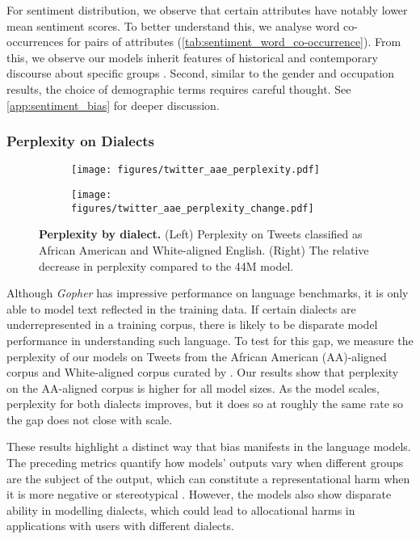 \documentclass[11pt, a4paper, logo, internal, copyright, nonumbering]{deepmind}
\newcommand{\gopher}{\textit{Gopher}\xspace}
\begin{document}
For sentiment distribution, we observe that certain attributes have notably lower mean sentiment scores.
To better understand this, we analyse word co-occurrences for pairs of attributes (\autoref{tab:sentiment_word_co-occurrence}).
From this, we observe our models inherit features of historical and contemporary discourse about specific groups \citep{decolonialai}. Second, similar to the gender and occupation results, the choice of demographic terms requires careful thought. See \autoref{app:sentiment_bias} for deeper discussion.


\subsubsection{Perplexity on Dialects}

\begin{figure}[t]
\centering
\begin{subfigure}[b]{.45\textwidth}
  \centering
  \texttt{[image: figures/twitter\_aae\_perplexity.pdf]}
  \label{fig:twitter_aae_ppx}
\end{subfigure}
\begin{subfigure}[b]{.45\textwidth}
  \centering
  \texttt{[image: figures/twitter\_aae\_perplexity\_change.pdf]}
    \label{fig:twitter_aae_ppx_change}
\end{subfigure}
  \caption{\textbf{Perplexity by dialect.} (Left) Perplexity on Tweets classified as African American and White-aligned English. (Right) The relative decrease in perplexity compared to the 44M model.}
\label{fig:twitter_aae}
\end{figure}

Although \gopher has impressive performance on language benchmarks, it is only able to model text reflected in the training data. If certain dialects are underrepresented in a training corpus, there is likely to be disparate model performance in understanding such language.
To test for this gap, 
we measure the perplexity of our models on Tweets from the African American (AA)-aligned corpus and White-aligned corpus curated by \citet{twitteraae}. Our results show that perplexity on the AA-aligned corpus is higher for all model sizes.
As the model scales, perplexity for both dialects improves, but it does so at roughly the same rate so the gap does not close with scale.

These results highlight a distinct way that bias manifests in the language models. 
The preceding metrics quantify how models' outputs vary when different groups are the subject of the output, which can constitute a representational harm when it is more negative or stereotypical \citep{blodgett2020language}.  
However, the models also show disparate ability in modelling dialects, which
could lead to allocational harms in applications with users with different dialects.
\end{document}
